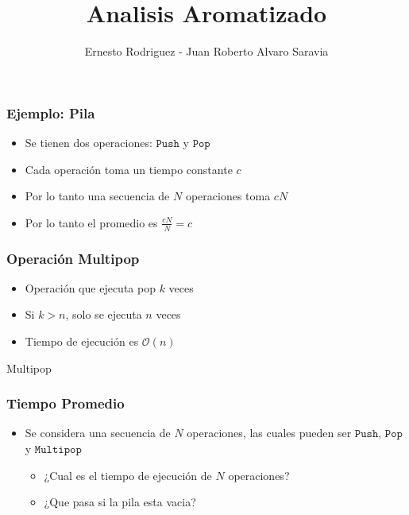 \documentclass{beamer}
\title[Codiciosos]{Analisis Aromatizado}
\author{Ernesto Rodriguez - Juan Roberto Alvaro Saravia}
\institute{
    Universidad Francisco Marroquin \\
    \medskip \textit{ernestorodriguez@ufm.edu - juanalvarado@ufm.edu}
}
\date[\today]{}
\begin{document}
\begin{frame}
\titlepage
\end{frame}

\begin{frame}
\frametitle{Ejemplo: Pila}
\begin{itemize}
    \item{Se tienen dos operaciones: $\mathtt{Push}$ y $\mathtt{Pop}$}
    \item{Cada operaci\'on toma un tiempo constante $c$}
    \item{Por lo tanto una secuencia de $N$ operaciones toma $cN$}
    \item{Por lo tanto el promedio es $\frac{cN}{N}=c$}
\end{itemize}
\end{frame}

\begin{frame}
\frametitle{Operaci\'on Multipop}
\begin{itemize}
    \item{Operaci\'on que ejecuta pop $k$ veces}
    \item{Si $k>n$, solo se ejecuta $n$ veces}
    \item{Tiempo de ejecuci\'on es $\mathcal{O}(n)$}
\end{itemize}
\begin{algorithm}[H]
    \caption{Multipop}
    \begin{algorithmic}[1]
    \EndWhile
    \EndProcedure
    \end{algorithmic}
\end{algorithm}
\end{frame}

\begin{frame}
\frametitle{Tiempo Promedio}
\begin{itemize}
    \item{Se considera una secuencia de $N$ operaciones,
    las cuales pueden ser $\mathtt{Push}$, $\mathtt{Pop}$
    y $\mathtt{Multipop}$
    \begin{itemize}
        \item{¿Cual es el tiempo de ejecuci\'on de $N$ operaciones?}
        \item{¿Que pasa si la pila esta vacia?}
    \end{itemize}
    }
\end{itemize}
\end{frame}
\end{document}
